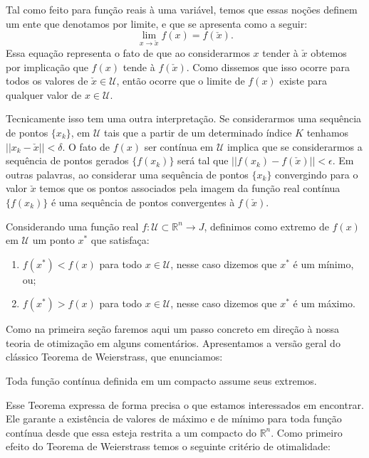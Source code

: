 \par Tal como feito para função reais à uma variável, temos que essas noções definem um ente que denotamos por limite, e que se apresenta como a seguir:
$$\lim_{x \rightarrow \check{x}}f(x)= f(\check{x}).$$
Essa equação representa o fato de que ao considerarmos $x$ tender à $\check{x}$ obtemos por implicação que $f(x)$ tende à $f(\check{x})$. Como dissemos que isso ocorre para todos os valores de $\check{x} \in \mathcal{U}$, então ocorre que o limite de $f(x)$ existe para qualquer valor de $x \in \mathcal{U}$.

\par  Tecnicamente isso tem uma outra interpretação. Se considerarmos uma sequência de pontos $\{x_k\}$, em $\mathcal{U}$ tais que a partir de um determinado índice $K$ tenhamos $||x_k - \check{x}|| < \delta$. O fato de $f(x)$ ser contínua em $\mathcal{U}$ implica que se considerarmos a sequência de pontos gerados $\{f(x_k)\}$ será tal que $||f(x_k) - f(\check{x})|| < \epsilon$. Em outras palavras, ao considerar uma sequência de pontos $\{x_k\}$ convergindo para o valor $\check{x}$ temos que os pontos associados pela imagem da função real contínua $\{f(x_k)\}$ é uma sequência de pontos convergentes à $f(\check{x})$.

\begin{definition}[Extremos de $f(x)$]
  Considerando uma função real $f : \mathcal{U} \subset \mathbb{R}^n \rightarrow J$, definimos como extremo de $f(x)$ em $\mathcal{U}$ um ponto $x^*$ que satisfaça:
  \begin{enumerate}
  \item $f(x^*) < f(x)$ para todo $x \in \mathcal{U}$, nesse caso dizemos que $x^*$ é um mínimo, ou;
  \item $f(x^*) > f(x)$ para todo $x \in \mathcal{U}$, nesse caso dizemos que $x^*$ é um máximo.
  \end{enumerate}
\end{definition}


\par Como na primeira seção faremos aqui um passo concreto em direção à nossa teoria de otimização em alguns comentários.  Apresentamos a versão geral do clássico Teorema de Weierstrass, que enunciamos:

\begin{theorem}
  Toda função contínua definida em um compacto assume seus extremos.
\end{theorem}

\par Esse Teorema expressa de forma precisa o que estamos interessados em encontrar. Ele garante a existência de valores de máximo e de mínimo para toda função contínua desde que essa esteja restrita a um compacto do $\mathbb{R}^n$. Como primeiro efeito do Teorema de Weierstrass temos o seguinte critério de otimalidade:

